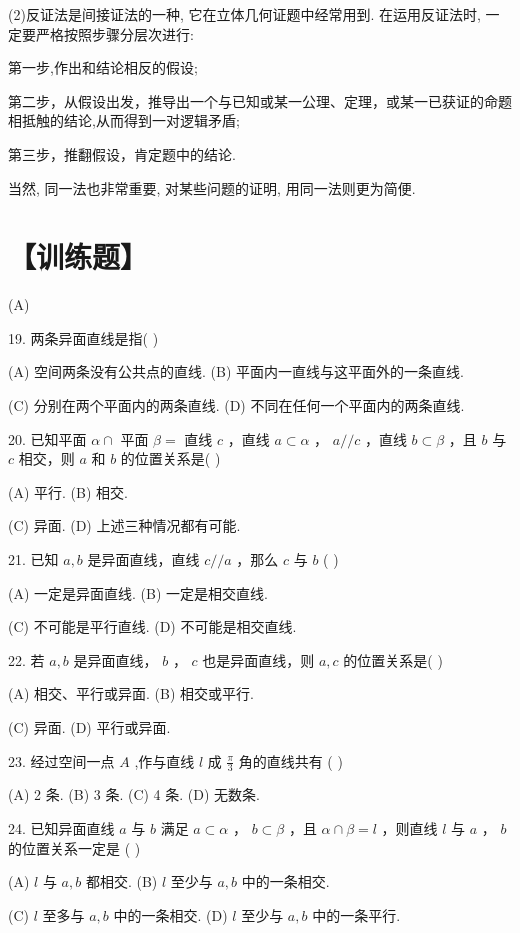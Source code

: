 \documentclass[10pt]{article}
\begin{document}
(2)反证法是间接证法的一种, 它在立体几何证题中经常用到. 在运用反证法时, 一定要严格按照步骤分层次进行:

第一步,作出和结论相反的假设;

第二步，从假设出发，推导出一个与已知或某一公理、定理，或某一已获证的命题相抵触的结论,从而得到一对逻辑矛盾;

第三步，推翻假设，肯定题中的结论.

当然, 同一法也非常重要, 对某些问题的证明, 用同一法则更为简便.

\section*{【训练题】}

(A)

19. 两条异面直线是指( )

(A) 空间两条没有公共点的直线. (B) 平面内一直线与这平面外的一条直线.

(C) 分别在两个平面内的两条直线. (D) 不同在任何一个平面内的两条直线.

20. 已知平面 \(\alpha  \cap\) 平面 \(\beta  =\) 直线 \(c\) ，直线 \(a \subset  \alpha\) ， \(a//c\) ，直线 \(b \subset  \beta\) ，且 \(b\) 与 \(c\) 相交，则 \(a\) 和 \(b\) 的位置关系是( )

(A) 平行. (B) 相交.

(C) 异面. (D) 上述三种情况都有可能.

21. 已知 \(a,b\) 是异面直线，直线 \(c//a\) ，那么 \(c\) 与 \(b\) ( )

(A) 一定是异面直线. (B) 一定是相交直线.

(C) 不可能是平行直线. (D) 不可能是相交直线.

22. 若 \(a,b\) 是异面直线， \(b\) ， \(c\) 也是异面直线，则 \(a,c\) 的位置关系是( )

(A) 相交、平行或异面. (B) 相交或平行.

(C) 异面. (D) 平行或异面.

23. 经过空间一点 \(A\) ,作与直线 \(l\) 成 \(\frac{\pi }{3}\) 角的直线共有 ( )

(A) 2 条. (B) 3 条. (C) 4 条. (D) 无数条.

24. 已知异面直线 \(a\) 与 \(b\) 满足 \(a \subset  \alpha\) ， \(b \subset  \beta\) ，且 \(\alpha  \cap  \beta  = l\) ，则直线 \(l\) 与 \(a\) ， \(b\) 的位置关系一定是 ( )

(A) \(l\) 与 \(a,b\) 都相交. (B) \(l\) 至少与 \(a,b\) 中的一条相交.

(C) \(l\) 至多与 \(a,b\) 中的一条相交. (D) \(l\) 至少与 \(a,b\) 中的一条平行.
\end{document}
